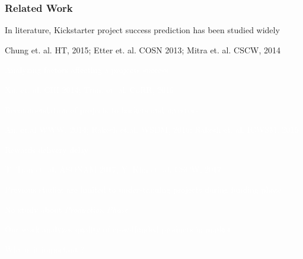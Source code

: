 \documentclass[9pt]{beamer}
\newcommand{\SubItemBlue}[1]{
	{\setlength\itemindent{15pt} \item[\color{blue}\textbullet] #1}
}
\newcommand{\SubItemWhite}[1]{
	{\setlength\itemindent{15pt} \item[\color{white}\textbullet] #1}
}
\begin{document}
\begin{frame}
\frametitle{Related Work}
\begin{itemize}[label=\textcolor{blue}{\textbullet}]
	\item{In literature, Kickstarter project success prediction has been studied widely}
	\SubItemBlue{\small Chung et. al. HT, 2015; Etter et. al. COSN 2013; Mitra et. al. CSCW, 2014}
	\item[\textcolor{white}{\textbullet}]{\textcolor{white} {Analyzing factors affecting a projects success}}
	\SubItemWhite{\small \textcolor{white} {Xu. et. al. CHI 2014; Tran. et. al. CoRR, 2016}}
	\item[\textcolor{white}{\textbullet}]{\textcolor{white} {Recommendation of projects to backers and investors }}
	\SubItemWhite{\small \textcolor{white} {An. et.al WWW, 2014; Rakesh et.al. WSDM, 2016; Rakesh et. al. ICWSM, 2015}}
	\item[\textcolor{white}{\textbullet}]{\textcolor{white} {Rewards delivery delay}}
	\SubItemWhite{\small \textcolor{white} {T. Tran et. al. ASONAM 2017, Y. Kim et. al. CSCW, 2017}}
	
	\item[\textcolor{white}{\textbullet}]{\textcolor{white} {Previous studies are limited to understanding projects during funding phase}}
	\vspace{10pt}
	\item[\textcolor{white}{\textbullet}]{\textcolor{white} {No study about \textit{Production Phase}}}
	
\end{itemize}

\vspace{10pt}
\centering
\textcolor{white} {Our work analyzes quality of crowdfunded products in market.}

\vspace{10pt}
\centering
\textcolor{white}{Why is it important ?}

\end{frame}
\end{document}
